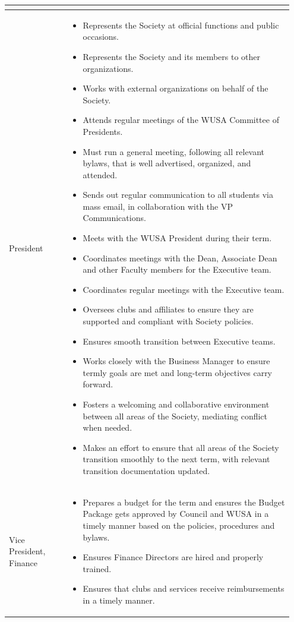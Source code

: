 \begin{longtable}{p{0.2\linewidth} p{0.75\linewidth}}
\begin{itemize}
\end{itemize}
\\
\midrule
President &
\begin{itemize}
\item Represents the Society at official functions and public occasions.
\item Represents the Society and its members to other organizations.
\item Works with external organizations on behalf of the Society.
\item Attends regular meetings of the WUSA Committee of Presidents.
\item Must run a general meeting, following all relevant bylaws, that is well advertised, organized, and attended.
\item Sends out regular communication to all students via mass email, in collaboration with the VP Communications.
\item Meets with the WUSA President during their term.
\item Coordinates meetings with the Dean, Associate Dean and other Faculty members for the Executive team.
\item Coordinates regular meetings with the Executive team.
\item Oversees clubs and affiliates to ensure they are supported and compliant with Society policies.
\item Ensures smooth transition between Executive teams.
\item Works closely with the Business Manager to ensure termly goals are met and long-term objectives carry forward.
\item Fosters a welcoming and collaborative environment between all areas of the Society, mediating conflict when needed.
\item Makes an effort to ensure that all areas of the Society transition smoothly to the next term, with relevant transition documentation updated.
\end{itemize}
\\
\midrule
Vice President, Finance &
\begin{itemize}
\item Prepares a budget for the term and ensures the Budget Package gets approved by Council and WUSA in a timely manner based on the policies, procedures and bylaws.
\item Ensures Finance Directors are hired and properly trained.
\item Ensures that clubs and services receive reimbursements in a timely manner.

\end{itemize}
\end{longtable}
